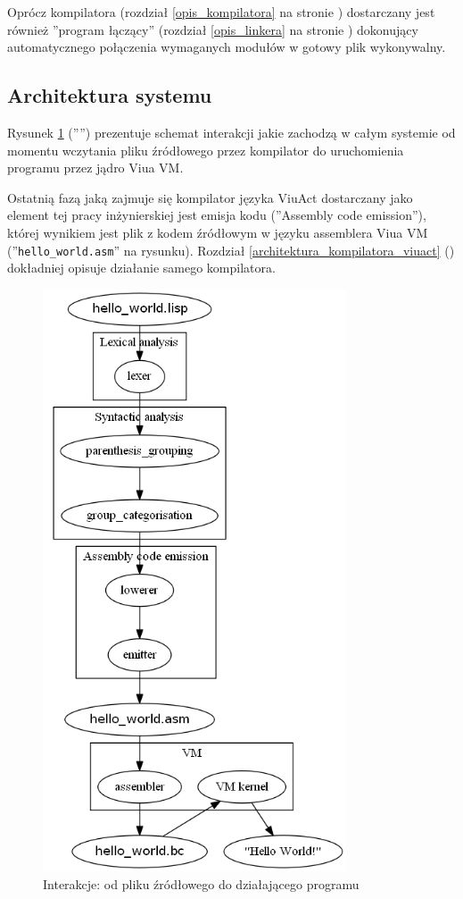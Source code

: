\documentclass[11pt,oneside,a4paper,titlepage,onecolumn]{article}
\begin{document}
Oprócz kompilatora (rozdział \ref{opis_kompilatora} na stronie \pageref{opis_kompilatora}) dostarczany jest
również ''program łączący'' (rozdział \ref{opis_linkera} na stronie \pageref{opis_linkera}) dokonujący
automatycznego połączenia wymaganych modułów w gotowy plik wykonywalny.

\newpage

\subsection{Architektura systemu}
\label{architektura_systemu}

Rysunek \ref{schemat_interakcji_viuact_z_viuavm} ('''') prezentuje
schemat interakcji jakie zachodzą w całym systemie od momentu wczytania pliku źródłowego przez kompilator do
uruchomienia programu przez jądro Viua VM.

Ostatnią fazą jaką zajmuje się kompilator języka ViuAct dostarczany jako element tej pracy inżynierskiej jest
emisja kodu (''Assembly code emission''), której wynikiem jest plik z kodem źródłowym w języku assemblera Viua
VM (''\texttt{hello\_world.asm}'' na rysunku). Rozdział \ref{architektura_kompilatora_viuact}
() dokładniej opisuje działanie samego kompilatora.

\begin{figure}[!htp]
    \centering
    \includegraphics[width=9cm]{viuact-pipeline}
    \caption{Interakcje: od pliku źródłowego do działającego programu}
    \label{schemat_interakcji_viuact_z_viuavm}
\end{figure}
\end{document}
